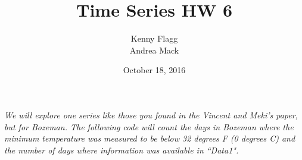 \documentclass[11pt]{article}
\title{Time Series HW 6}
\author{Kenny Flagg \\ Andrea Mack}
\date{October 18, 2016}
\begin{document}
\maketitle

\begin{knitrout}
\color{fgcolor}\begin{kframe}


{\ttfamily\noindent\bfseries{}}\end{kframe}
\end{knitrout}

{\it We will explore one series like those you found in the Vincent and Meki's paper, but for Bozeman. The following code will count the days in Bozeman where the minimum temperature was measured to be below 32 degrees F (0 degrees C) and the number of days where information was available in ``Data1". }
\end{document}
